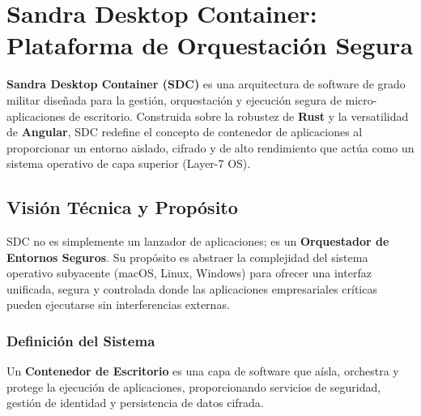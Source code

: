 \chapter{Sandra Desktop Container: Plataforma de Orquestación Segura}

\textbf{Sandra Desktop Container (SDC)} es una arquitectura de software de grado militar diseñada para la gestión, orquestación y ejecución segura de micro-aplicaciones de escritorio. Construida sobre la robustez de \textbf{Rust} y la versatilidad de \textbf{Angular}, SDC redefine el concepto de contenedor de aplicaciones al proporcionar un entorno aislado, cifrado y de alto rendimiento que actúa como un sistema operativo de capa superior (Layer-7 OS).


\section{Visión Técnica y Propósito}

SDC no es simplemente un lanzador de aplicaciones; es un \textbf{Orquestador de Entornos Seguros}. Su propósito es abstraer la complejidad del sistema operativo subyacente (macOS, Linux, Windows) para ofrecer una interfaz unificada, segura y controlada donde las aplicaciones empresariales críticas pueden ejecutarse sin interferencias externas.


\subsection{Definición del Sistema}

\begin{definicion}
Un \textbf{Contenedor de Escritorio} es una capa de software que aísla, orchestra y protege la ejecución de aplicaciones, proporcionando servicios de seguridad, gestión de identidad y persistencia de datos cifrada.
\end{definicion}

